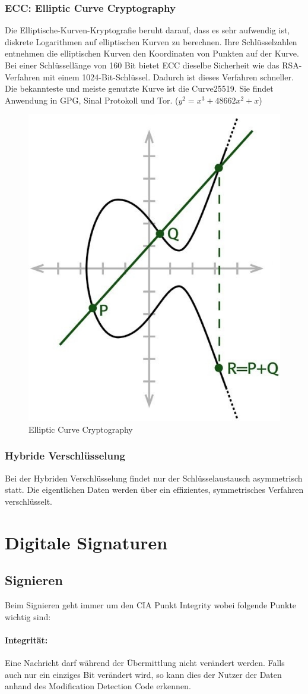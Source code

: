 \subsubsection{ECC: Elliptic Curve Cryptography}
Die Elliptische-Kurven-Kryptografie beruht darauf, dass es sehr aufwendig ist, diskrete Logarithmen auf elliptischen Kurven zu berechnen. Ihre Schlüsselzahlen entnehmen die elliptischen Kurven den Koordinaten von Punkten auf der Kurve. Bei einer Schlüssellänge von 160 Bit bietet ECC dieselbe Sicherheit wie das RSA-Verfahren mit einem 1024-Bit-Schlüssel. Dadurch ist dieses Verfahren schneller. Die bekannteste und meiste genutzte Kurve ist die Curve25519. Sie findet Anwendung in GPG, Sinal Protokoll und Tor. ($y^2 = x^3 + 48662x^2 + x$)

\begin{figure}[h!]
\centering
\includegraphics[width=0.2\linewidth]{images/ecc}
\caption{Elliptic Curve Cryptography}
\end{figure}


\subsubsection{Hybride Verschlüsselung}
Bei der Hybriden Verschlüsselung findet nur der Schlüsselaustausch asymmetrisch statt. Die eigentlichen Daten werden über ein effizientes, symmetrisches Verfahren verschlüsselt. 


\section{Digitale Signaturen}
\subsection{Signieren}
Beim Signieren geht immer um den CIA Punkt Integrity wobei folgende Punkte wichtig sind:
\paragraph{Integrität:} Eine Nachricht darf während der Übermittlung nicht verändert werden. Falls auch nur ein einziges Bit verändert wird, so kann dies der Nutzer der Daten anhand des Modification Detection Code erkennen.
